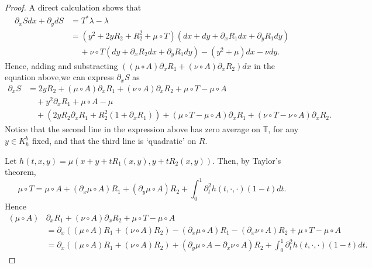 \documentclass[10pt]{article}
\newcommand{\C}{\mathbb{C}}
\newcommand{\T}{\mathbb{T}}
\begin{document}
\begin{proof}

    A direct calculation shows that
    \begin{align*}
        \partial_x S dx + \partial_y dS & =  T^*\lambda - \lambda \\
         & = (y^2 + 2yR_2 + R^2_2 + \mu\circ T)(dx + dy + \partial_xR_1dx + \partial_yR_1dy)  \\ 
         & \, \quad + \nu\circ T (dy + \partial_xR_2dx + \partial_y R_1 dy)  - (y^2 + \mu)dx - \nu dy.
    \end{align*}
Hence, adding and substracting $( (\mu \circ A) \partial_x R_1 + (\nu \circ A) \partial_x R_2)dx$ in the equation above,we can express $\partial_x S$ as
\begin{equation}
\label{eq:x_component_expression_1}
\begin{aligned}
\partial_x S &  =  2yR_2  + (\mu \circ A) \partial_x R_1 +  (\nu \circ A) \partial_x R_2 + \mu \circ T - \mu \circ A\\
& \quad + y^2 \partial_xR_1 + \mu \circ A - \mu\\
& \quad + (2yR_2 \partial_x R_1 + R^2_2(1 + \partial_x R_1)) + (\mu \circ T - \mu \circ A) \partial_x R_1 +  (\nu \circ T - \nu \circ A) \partial_x R_2.
\end{aligned}
\end{equation}
Notice that the second line in the expression above has zero average on $\T$, for any $y \in K_h^b$ fixed, and that the third line is `quadratic' on $R$. 

Let $h(t, x, y)= \mu(x + y + tR_1(x, y), y + tR_2(x, y))$. Then, by Taylor's theorem, 
\[ \mu \circ T = \mu \circ A + (\partial_x\mu \circ A)R_1 + (\partial_y\mu \circ A)R_2 + \int_0^1 \partial_t^2h(t, \cdot,\cdot) (1 -t)dt. \]
Hence
\begin{align*}
     (\mu \circ A) & \partial_x R_1 +  (\nu \circ A) \partial_x R_2 + \mu \circ T - \mu \circ A \\ & = \partial_x((\mu \circ A)R_1 + (\nu \circ A)R_2) - (\partial_x\mu \circ A)R_1 - (\partial_x\nu \circ A)R_2 +  \mu \circ T - \mu \circ A \\
     & = \partial_x((\mu \circ A)R_1 + (\nu \circ A)R_2) + (\partial_y\mu \circ A - \partial_x\nu \circ A)R_2 + \int_0^1 \partial_t^2h(t, \cdot,\cdot) (1 -t)dt.
\end{align*}


\end{proof}
\end{document}
